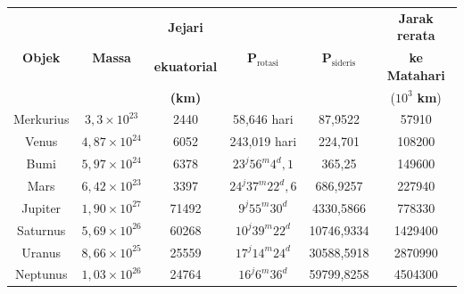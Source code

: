 \documentclass[11pt,fleqn, a4paper]{exam}
\begin{document}
\newpage
\begin{table}[ht]
\centering
\label{tab:konstanta02}
\renewcommand{\arraystretch}{1.4}
\begin{tabular}{|c|c|c|c|c|c|}
\hline
\multirow{3}{*}{\textbf{Objek}} & \multirow{3}{*}{\textbf{Massa}} & \textbf{Jejari} & \multirow{3}{*}{\textbf{P}$_{\text{rotasi}}$} & \multirow{3}{*}{\textbf{P}$_{\text{sideris}}$} & \textbf{Jarak rerata} \\
& & \textbf{ekuatorial} & & & \textbf{ke Matahari} \\
& \textbf{(kg)} & \textbf{(km)} & & \textbf{(hari)} & ($10^{3}$ \textbf{km})\\
\hline
\hline
Merkurius & $3,3 \times 10^{23}$ & 2440 & 58,646 hari & 87,9522 & 57910 \\
\hline
Venus & $4,87 \times 10^{24} $ & 6052 & 243,019 hari & 224,701 & 108200 \\
\hline
Bumi & $5,97 \times 10^{24}$ & 6378 & $23^{j}56^{m}4^{d},1$ & 365,25 & 149600\\
\hline
Mars & $6,42 \times 10^{23}$ & 3397 & $24^{j}37^{m}22^{d},6$ & 686,9257 & 227940\\
\hline
Jupiter & $1,90 \times 10^{27}$ & 71492 & $9^{j}55^{m}30^{d}$ & 4330,5866 & 778330\\
\hline
Saturnus & $5,69 \times 10^{26}$ & 60268 & $10^{j}39^{m}22^{d}$ & 10746,9334 & 1429400\\
\hline
Uranus & $8,66 \times 10^{25}$ & 25559 & $17^{j}14^{m}24^{d}$ & 30588,5918 & 2870990\\
\hline
Neptunus & $1,03 \times 10^{26}$ & 24764 & $16^{j}6^{m}36^{d}$ & 59799,8258 & 4504300\\
\hline
\end{tabular}
\end{table}
\end{document}
